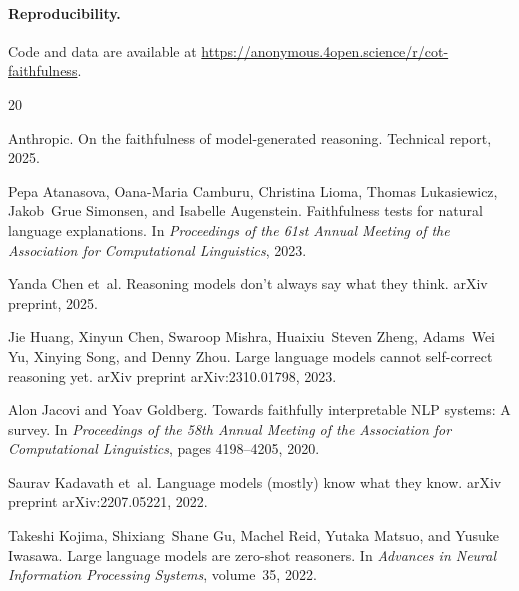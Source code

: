 \documentclass{article}
\begin{document}
\paragraph{Reproducibility.} Code and data are available at \url{https://anonymous.4open.science/r/cot-faithfulness}.



\begin{thebibliography}{20}

Anthropic.
\newblock On the faithfulness of model-generated reasoning.
\newblock Technical report, 2025.

Pepa Atanasova, Oana-Maria Camburu, Christina Lioma, Thomas Lukasiewicz, Jakob~Grue Simonsen, and Isabelle Augenstein.
\newblock Faithfulness tests for natural language explanations.
\newblock In \emph{Proceedings of the 61st Annual Meeting of the Association for Computational Linguistics}, 2023.

Yanda Chen et~al.
\newblock Reasoning models don't always say what they think.
\newblock arXiv preprint, 2025.

Jie Huang, Xinyun Chen, Swaroop Mishra, Huaixiu~Steven Zheng, Adams~Wei Yu, Xinying Song, and Denny Zhou.
\newblock Large language models cannot self-correct reasoning yet.
\newblock arXiv preprint arXiv:2310.01798, 2023.

Alon Jacovi and Yoav Goldberg.
\newblock Towards faithfully interpretable NLP systems: A survey.
\newblock In \emph{Proceedings of the 58th Annual Meeting of the Association for Computational Linguistics}, pages 4198--4205, 2020.

Saurav Kadavath et~al.
\newblock Language models (mostly) know what they know.
\newblock arXiv preprint arXiv:2207.05221, 2022.

Takeshi Kojima, Shixiang~Shane Gu, Machel Reid, Yutaka Matsuo, and Yusuke Iwasawa.
\newblock Large language models are zero-shot reasoners.
\newblock In \emph{Advances in Neural Information Processing Systems}, volume~35, 2022.


\end{thebibliography}
\end{document}
